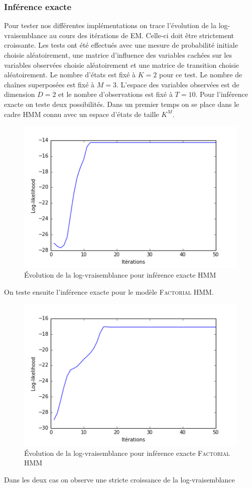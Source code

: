 \documentclass[10pt,a4paper]{article}
\newcommand{\hmm}{\textsc{HMM}}
\newcommand{\fhmm}{\textsc{Factorial HMM}}
\newcommand{\EM}{\textsc{EM}}
\begin{document}
\subsubsection{Inférence exacte}
Pour tester nos différentes implémentations on trace l'évolution de la 
log-vraisemblance au cours des itérations de \EM.
Celle-ci doit être strictement croissante.
Les tests ont été effectués avec une mesure de probabilité initiale choisie 
aléatoirement, une matrice d'influence des variables cachées sur les variables 
observées choisie aléatoirement et une matrice de transition choisie 
aléatoirement. Le nombre d'états est fixé à $K = 2$ pour ce test. Le nombre de 
chaînes superposées est fixé à $M = 3$. L'espace des variables observées est de 
dimension $D=2$ et le nombre d'observations est fixé à $T=10$. Pour 
l'inférence 
exacte on teste deux possibilités. Dans un premier temps on se place dans le 
cadre \hmm{} connu avec un espace d'états de taille $K^M$.
\begin{figure}[H]
\centering
\includegraphics[scale=0.5]{../resources/pictures/M3_K2_hmm.png}
\caption{Évolution de la log-vraisemblance pour inférence exacte \hmm}
\end{figure}
On teste ensuite l'inférence exacte pour le modèle \fhmm.
\begin{figure}[H]
\centering
\includegraphics[scale=0.5]{../resources/pictures/M3_K2_fhmm_exact.png}
\caption{Évolution de la log-vraisemblance pour inférence exacte \fhmm}
\end{figure}
Dans les deux cas on observe une stricte croissance de la log-vraisemblance
\end{document}
